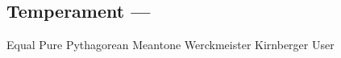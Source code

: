 \subsection[Temperament]{Temperament --- \UiKey{\I}\UiKey{\SET}}










































Equal
Pure
Pythagorean
Meantone
Werckmeister
Kirnberger
User

